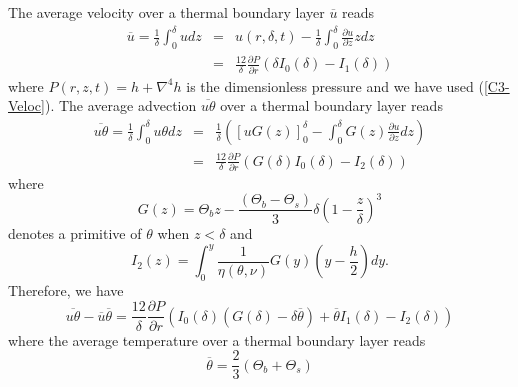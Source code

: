   The average  velocity over  a thermal boundary  layer $\overline{u}$
  reads
  \begin{eqnarray}
    \overline{u}        =\frac{1}{\delta}\int_0^{\delta}udz        &=&
                                                                       u(r,\delta,t) - \frac{1}{\delta}\int_0^{\delta}\frac{\partial
                                                                       u}{\partial z} zdz\\
                                                                   &=&\frac{12}{\delta}
                                                                       \frac{\partial
                                                                       P}{\partial
                                                                       r}\left(\delta
                                                                       I_0(\delta)-I_1(\delta)\right)
  \end{eqnarray}
  where $P(r,z,t) = h+\nabla^4h$ is  the dimensionless pressure and we
  have     used    (\ref{C3-Veloc}).      The    average     advection
  $\overline{u\theta}$ over a thermal boundary layer reads
  \begin{eqnarray}
    \overline{u\theta}=\frac{1}{\delta}\int_0^{\delta}u\theta dz &=& \frac{1}{\delta}\left( [ uG(z) ]_{0}^{\delta} -\int_0^\delta
                                                                     G(z)\frac{\partial
                                                                     u}{\partial
                                                                     z}
                                                                     dz\right)\nonumber\\
                                                                 &=&\frac{12}{\delta} \frac{\partial P}{\partial r}\left(G(\delta)I_0(\delta)-I_2(\delta)\right)
  \end{eqnarray}
  where
  \begin{equation}
    G(z)                  =                 \Theta_b                  z
    -\frac{\left(\Theta_b-\Theta_s\right)}{3}\delta\left(1-\frac{z}{\delta}\right)^3
  \end{equation}
  denotes a primitive of $\theta$ when $z<\delta$ and
  \begin{equation}
    I_2(z)=\int_0^y                         \frac{1}{\eta(\theta,\nu)}G(y)
    \left(y-\frac{h}{2}\right)dy.
  \end{equation}
  Therefore, we have
  \begin{equation}
    \overline{u\theta}-\overline{u}\overline{\theta}= \frac{12}{\delta} \frac{\partial P}{\partial r}\left(I_0(\delta)\left(G(\delta)-\delta\overline{\theta}\right)+\overline{\theta}I_1(\delta)-I_2(\delta)\right)
  \end{equation} 
  where the average temperature over a thermal boundary layer reads
  \begin{equation}
    \overline{\theta} = \frac{2}{3}\left( \Theta_{b}+\Theta_{s}\right)
    \label{C3-tbar}
  \end{equation}

